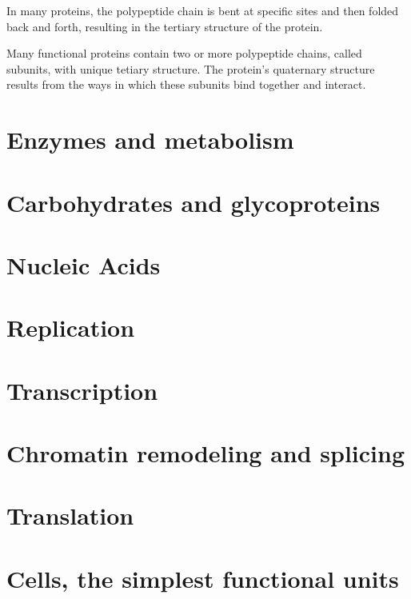 \documentclass[../bio.tex]{subfiles}
\begin{document}
In many proteins, the polypeptide chain is bent at specific sites and then folded back and forth, resulting in the tertiary structure of the protein.

Many functional proteins contain two or more polypeptide chains, called subunits, with unique tetiary structure. The protein's quaternary structure results from the ways in which these subunits bind together and interact.

\section{Enzymes and metabolism}
\section{Carbohydrates and glycoproteins}
\section{Nucleic Acids}
\section{Replication}
\section{Transcription}
\section{Chromatin remodeling and splicing}
\section{Translation}
\section{Cells, the simplest functional units}
\end{document}
